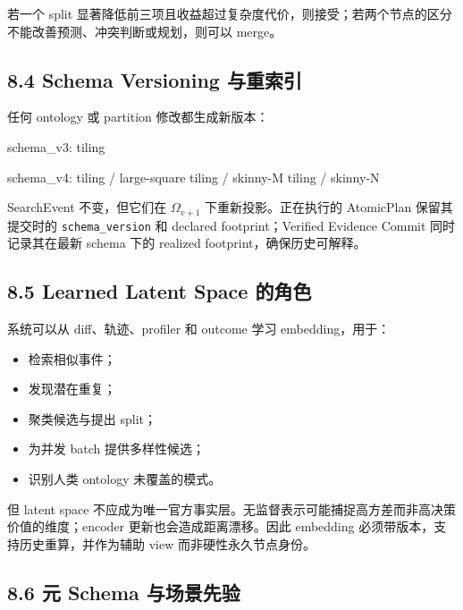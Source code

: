 \documentclass[
  11pt]{ctexart}
\newenvironment{Shaded}{}{}
\newcommand{\NormalTok}[1]{#1}
\providecommand{\tightlist}{%
  \setlength{\itemsep}{0pt}\setlength{\parskip}{0pt}}
\begin{document}
若一个 split
显著降低前三项且收益超过复杂度代价，则接受；若两个节点的区分不能改善预测、冲突判断或规划，则可以
merge。

\subsection{8.4 Schema Versioning
与重索引}\label{schema-versioning-ux4e0eux91cdux7d22ux5f15}

任何 ontology 或 partition 修改都生成新版本：

\begin{Shaded}
\begin{Highlighting}[]
\NormalTok{schema\_v3:}
\NormalTok{  tiling}

\NormalTok{schema\_v4:}
\NormalTok{  tiling / large{-}square}
\NormalTok{  tiling / skinny{-}M}
\NormalTok{  tiling / skinny{-}N}
\end{Highlighting}
\end{Shaded}

SearchEvent 不变，但它们在 \(\Omega_{v+1}\) 下重新投影。正在执行的
AtomicPlan 保留其提交时的 \texttt{schema\_version} 和 declared
footprint；Verified Evidence Commit 同时记录其在最新 schema 下的
realized footprint，确保历史可解释。

\subsection{8.5 Learned Latent Space
的角色}\label{learned-latent-space-ux7684ux89d2ux8272}

系统可以从 diff、轨迹、profiler 和 outcome 学习 embedding，用于：

\begin{itemize}
\tightlist
\item
  检索相似事件；
\item
  发现潜在重复；
\item
  聚类候选与提出 split；
\item
  为并发 batch 提供多样性候选；
\item
  识别人类 ontology 未覆盖的模式。
\end{itemize}

但 latent space
不应成为唯一官方事实层。无监督表示可能捕捉高方差而非高决策价值的维度；encoder
更新也会造成距离漂移。因此 embedding
必须带版本，支持历史重算，并作为辅助 view 而非硬性永久节点身份。

\subsection{8.6 元 Schema
与场景先验}\label{ux5143-schema-ux4e0eux573aux666fux5148ux9a8c}
\end{document}
